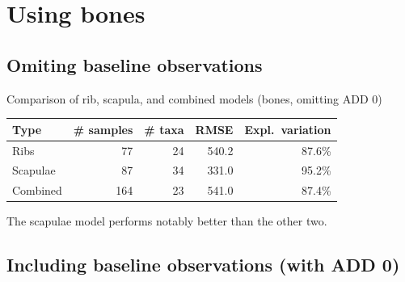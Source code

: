 \documentclass{beamer}
\begin{document}
\section{Using bones}


\subsection{Omiting baseline observations}

\begin{frame}{Comparison of rib, scapula, and combined models (bones, omitting ADD 0)}

  \begin{tabular}{lrrrr}
    Type & \# samples & \# taxa & RMSE & Expl.\ variation\\ \hline
    Ribs & 77 & 24 & 540.2 & 87.6\% \\
    Scapulae & 87 & 34 & 331.0 & 95.2\% \\
    Combined & 164 & 23 & 541.0 & 87.4\%
  \end{tabular}

  \vspace{0.2in}

  \footnotesize{
    \noindent The scapulae model performs notably better than the other two.
    }

\end{frame}










\subsection{Including baseline observations (with ADD 0)}
\end{document}

